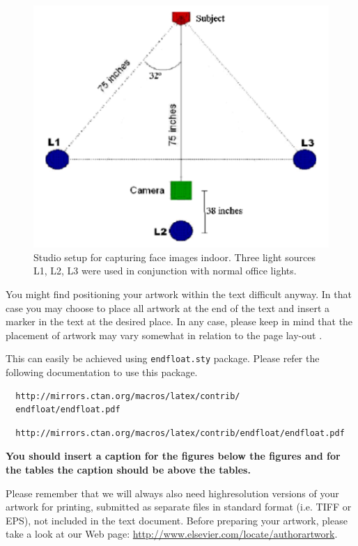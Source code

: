 \documentclass[times,twocolumn,final]{elsarticle}
\begin{document}
\begin{figure}[!t]
\centering
\includegraphics[scale=.5]{medimafig01}
\caption{Studio setup for capturing face images indoor. Three light
sources L1, L2, L3 were used in conjunction with normal office lights.}
\end{figure}

You might find positioning your artwork within the text difficult
anyway. In that case you may choose to place all artwork at the end of
the text and insert a marker in the text at the desired place. In any
case, please keep in mind that the placement of artwork may vary
somewhat in relation to the page lay-out \citep{HullermeierRifqi2009}.

This can easily be achieved using \verb+endfloat.sty+ package. Please
refer the following documentation to use this package.
\makeatletter
\if@twocolumn
\begin{verbatim}
  http://mirrors.ctan.org/macros/latex/contrib/
  endfloat/endfloat.pdf
\end{verbatim}
\else
\begin{verbatim}
  http://mirrors.ctan.org/macros/latex/contrib/endfloat/endfloat.pdf
\end{verbatim}
\fi
\makeatother

\textcolor{newcolor}{\bf You should insert a caption for the figures
below the figures and for the tables the caption should be above the
tables.} 

Please remember that we will always also need highresolution versions
of your artwork for printing, submitted as separate files in standard
format (i.e. TIFF or EPS), not included in the text document. Before
preparing your artwork, please take a look at our Web page:
\url{http://www.elsevier.com/locate/authorartwork}.
\end{document}
